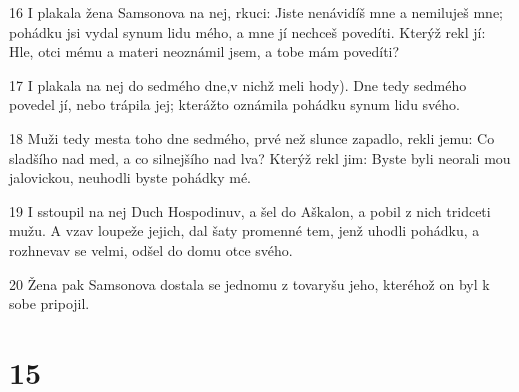\par 16 I plakala žena Samsonova na nej, rkuci: Jiste nenávidíš mne a nemiluješ mne; pohádku jsi vydal synum lidu mého, a mne jí nechceš povedíti. Kterýž rekl jí: Hle, otci mému a materi neoznámil jsem, a tobe mám povedíti?
\par 17 I plakala na nej do sedmého dne,v nichž meli hody). Dne tedy sedmého povedel jí, nebo trápila jej; kterážto oznámila pohádku synum lidu svého.
\par 18 Muži tedy mesta toho dne sedmého, prvé než slunce zapadlo, rekli jemu: Co sladšího nad med, a co silnejšího nad lva? Kterýž rekl jim: Byste byli neorali mou jalovickou, neuhodli byste pohádky mé.
\par 19 I sstoupil na nej Duch Hospodinuv, a šel do Aškalon, a pobil z nich tridceti mužu. A vzav loupeže jejich, dal šaty promenné tem, jenž uhodli pohádku, a rozhnevav se velmi, odšel do domu otce svého.
\par 20 Žena pak Samsonova dostala se jednomu z tovaryšu jeho, kteréhož on byl k sobe pripojil.

\chapter{15}

